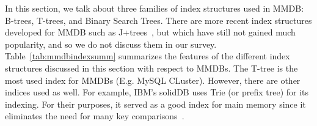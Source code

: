 \documentclass[12pt,a4paper]{article}
\begin{document}
In this section, we talk about three families of index structures used in MMDB: B-trees, T-trees, and Binary Search Trees. There are more recent index
structures developed for MMDB such as J+trees~\cite{luan2009prefetching}, but which have still not gained much popularity, and so we do not discuss them in our
survey. Table~\ref{tab:mmdbindexsumm} summarizes the features of the different index structures discussed in this section with respect to MMDBs. The T-tree is
the most used index for MMDBs (E.g. MySQL CLuster). However, there are other indices used as well. For example, IBM's solidDB uses Trie (or prefix tree) for its
indexing. For their purposes, it served as a good index for main memory since it eliminates the need for many key comparisons~\cite{ibmsoliddb}.


 \begin{table}[t!]
\centering
{}
\end{table}
\end{document}
